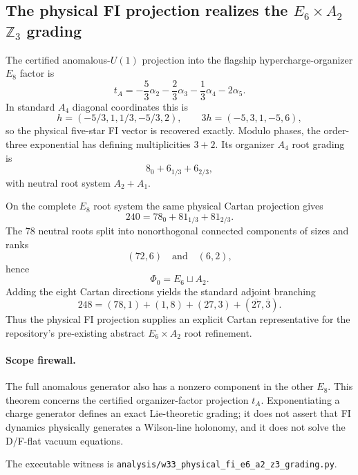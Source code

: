 \subsection*{The physical FI projection realizes the $E_6\times A_2$ $\mathbb Z_3$ grading}

The certified anomalous-$U(1)$ projection into the flagship
hypercharge-organizer $E_8$ factor is
\[
t_A=-\frac53\alpha_2-\frac23\alpha_3-\frac13\alpha_4-2\alpha_5.
\]
In standard $A_4$ diagonal coordinates this is
\[
h=(-5/3,1,1/3,-5/3,2),
\qquad
3h=(-5,3,1,-5,6),
\]
so the physical five-star FI vector is recovered exactly.  Modulo phases, the
order-three exponential has defining multiplicities $3+2$.  Its organizer
$A_4$ root grading is
\[
8_0+6_{1/3}+6_{2/3},
\]
with neutral root system $A_2+A_1$.

On the complete $E_8$ root system the same physical Cartan projection gives
\[
\boxed{240=78_0+81_{1/3}+81_{2/3}.}
\]
The $78$ neutral roots split into nonorthogonal connected components of sizes
and ranks
\[
(72,6)\quad\text{and}\quad(6,2),
\]
hence
\[
\boxed{\Phi_0=E_6\sqcup A_2.}
\]
Adding the eight Cartan directions yields the standard adjoint branching
\[
\boxed{
248=(78,1)+(1,8)+(27,3)+(\overline{27},\overline3)}.
\]
Thus the physical FI projection supplies an explicit Cartan representative for
the repository's pre-existing abstract $E_6\times A_2$ root refinement.

\paragraph{Scope firewall.}
The full anomalous generator also has a nonzero component in the other $E_8$.
This theorem concerns the certified organizer-factor projection $t_A$.
Exponentiating a charge generator defines an exact Lie-theoretic grading; it
does not assert that FI dynamics physically generates a Wilson-line holonomy,
and it does not solve the D/F-flat vacuum equations.

The executable witness is
\texttt{analysis/w33\_physical\_fi\_e6\_a2\_z3\_grading.py}.
